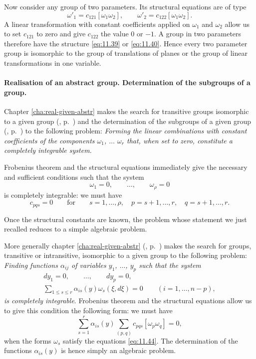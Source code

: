 Now consider any group of two parameters. Its structural equations are of type
\begin{equation}
  \label{eq:11.41}
  \omega'_{1}=c_{121}[\omega_{1}\omega_{2}],\qquad\omega'_{2}=c_{122}[\omega_{1}\omega_{2}].
\end{equation}
A linear transformation with constant coefficients applied on $\omega_{1}$ and $\omega_{2}$ allow us to set $c_{121}$ to zero and give $c_{122}$ the value $0$ or $-1$. A group in two parameters therefore have the structure \eqref{eq:11.39} or \eqref{eq:11.40}. Hence every two parameter group is isomorphic to the group of translations of planes or the group of linear transformations in one variable.

\paragraph{Realisation of an abstract group. Determination of the subgroups of a group.}
\label{sec:169}
Chapter \ref{cha:real-given-abstr} makes the search for transitive groups isomorphic to a given group (, p.~\pageref{sec:116}) and the determination of the subgroups of a given group (, p.~\pageref{sec:125}) to the following problem: \emph{Forming the linear combinations with constant coefficients of the components $\omega_{1}$, $\dots$ $\omega_{r}$ that, when set to zero, constitute a completely integrable system.}

Frobenius theorem and the structural equations immediately give the necessary and sufficient conditions such that the system 
\[
\omega_{1}=0,\qquad\dots,\qquad\omega_{\rho}=0
\]
is completely integrable: we must have
\begin{equation}
  \label{eq:11.42}
  c_{pqs}=0\qquad\text{for}\qquad s=1,\dots,\rho,\quad p=s+1,\dots,r,\quad q=s+1,\dots,r.
\end{equation}

Once the structural constants are known, the problem whose statement we just recalled reduces to a simple algebraic problem.

More generally chapter \ref{cha:real-given-abstr} (, p.~\pageref{sec:119}) makes the search for groups, transitive or intransitive, isomorphic to a given group to the following problem: \emph{Finding functions $\alpha_{ij}$ of variables $y_{1}$, $\dots$, $y_{p}$ such that the system}
\begin{gather}
  \label{eq:11.43}
  dy_{1}=0,\qquad\dots,\qquad dy_{p}=0,
  \\
  \label{eq:11.44}
  \sum_{1\le s\le r}\alpha_{is}(y)\omega_{s}(\xi,d\xi)=0\qquad(i=1,\dots,n-p),
\end{gather}
\emph{is completely integrable}. Frobenius theorem and the structural equations allow us to give this condition the following form: we must have
\begin{equation}
  \label{eq:11.55}
  \sum_{s=1}^{r}\alpha_{is}(y)\sum_{(p,q)}c_{pqs}[\omega_{p}\omega_{q}]=0,
\end{equation}
when the forms $\omega_{s}$ satisfy the equations \eqref{eq:11.44}. The determination of the functions $\alpha_{is}(y)$ is hence simply an algebraic problem.